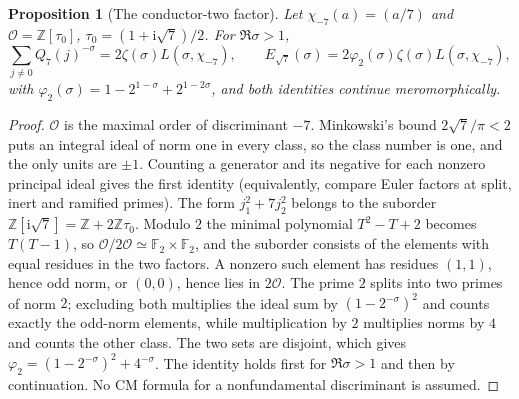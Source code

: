 \documentclass[11pt,letterpaper]{article}
\newtheorem{proposition}[theorem]{Proposition}
\theoremstyle{remark}\newtheorem{remark}[theorem]{Remark}
\newcommand{\ii}{\mathrm i}\newcommand{\ee}{\mathrm e}
\newcounter{l7gtrsavedeq}
\begin{document}
\begin{proposition}[The conductor-two factor]\label{l7g:tr:prop:conductor}
Let $\chi_{-7}(a)=(a/7)$ and $\mathcal O=\mathbb Z[\tau_0]$,
$\tau_0=(1+\ii\sqrt7)/2$. For $\Re\sigma>1$,
\begin{equation}\label{l7g:tr:eq:suborder}
 \sum_{j\ne0}Q_7(j)^{-\sigma}=2\zeta(\sigma)L(\sigma,\chi_{-7}),\qquad
 E_{\sqrt7}(\sigma)=2\varphi_2(\sigma)\zeta(\sigma)L(\sigma,\chi_{-7}),
\end{equation}
with $\varphi_2(\sigma)=1-2^{1-\sigma}+2^{1-2\sigma}$, and both identities
continue meromorphically.
\end{proposition}
\begin{proof}
$\mathcal O$ is the maximal order of discriminant $-7$. Minkowski's bound
$2\sqrt7/\pi<2$ puts an integral ideal of norm one in every class, so the
class number is one, and the only units are $\pm1$. Counting a generator
and its negative for each nonzero principal ideal gives the first identity
(equivalently, compare Euler factors at split, inert and ramified primes).
The form $j_1^2+7j_2^2$ belongs to the suborder
$\mathbb Z[\ii\sqrt7]=\mathbb Z+2\mathbb Z\tau_0$. Modulo $2$ the minimal
polynomial $T^2-T+2$ becomes $T(T-1)$, so
$\mathcal O/2\mathcal O\simeq\mathbb F_2\times\mathbb F_2$, and the suborder
consists of the elements with equal residues in the two factors. A nonzero
such element has residues $(1,1)$, hence odd norm, or $(0,0)$, hence lies in
$2\mathcal O$. The prime $2$ splits into two primes of norm $2$; excluding
both multiplies the ideal sum by $(1-2^{-\sigma})^2$ and counts exactly the
odd-norm elements, while multiplication by $2$ multiplies norms by $4$ and
counts the other class. The two sets are disjoint, which gives
$\varphi_2=(1-2^{-\sigma})^2+4^{-\sigma}$. The identity holds first for
$\Re\sigma>1$ and then by continuation. No CM formula for a nonfundamental
discriminant is assumed.
\end{proof}
\end{document}
